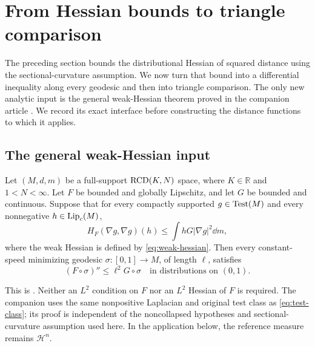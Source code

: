 \section{From Hessian bounds to triangle comparison}
\label{sec:weighted-comparison}

The preceding section bounds the distributional Hessian of squared
distance using the sectional-curvature assumption. We now turn that
bound into a differential inequality along every geodesic and then
into triangle comparison. The only new analytic input is the general
weak-Hessian theorem proved in the companion article
\cite[Theorem~1.1]{WeakHessianCompanion}. We record its exact interface
before constructing the distance functions to which it applies.

\subsection{The general weak-Hessian input}

\begin{theorem}
\label{weight:every-geodesic}
Let \((M,d,m)\) be a full-support \(\mathrm{RCD}(K,N)\) space, where
\(K\in\mathbb R\) and \(1<N<\infty\). Let \(F\) be bounded and
globally Lipschitz, and let \(G\) be bounded and continuous.
Suppose that for every compactly supported \(g\in\operatorname{Test}(M)\) and
every nonnegative \(h\in\operatorname{Lip}_c(M)\),
\begin{equation}
\label{weight:hessian-assumption}
 H_F(\nabla g,\nabla g)(h)
 \le \int hG|\nabla g|^2\dd m,
\end{equation}
where the weak Hessian is defined by \eqref{eq:weak-hessian}.
Then every constant-speed minimizing geodesic
\(\sigma:[0,1]\to M\), of length \(\ell\), satisfies
\begin{equation}
\label{weight:curve-hessian}
 (F\circ\sigma)''\le\ell^2G\circ\sigma
 \quad\text{in distributions on }(0,1).
\end{equation}
\end{theorem}

This is \cite[Theorem~1.1]{WeakHessianCompanion}. Neither an
\(L^2\) condition on \(F\) nor an \(L^2\) Hessian of \(F\) is
required. The companion uses the same nonpositive Laplacian and
original test class as \eqref{eq:test-class}; its proof is independent
of the noncollapsed hypotheses and sectional-curvature assumption
used here. In the application below, the reference measure remains
\(\mathcal H^n\).

